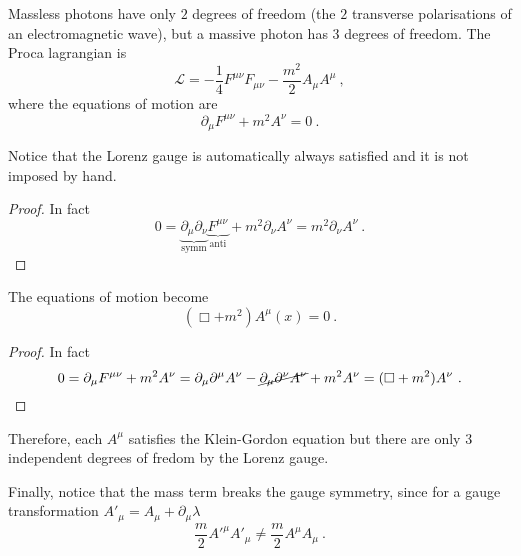     Massless photons have only $2$ degrees of freedom (the $2$ transverse polarisations of an electromagnetic wave), but a massive photon has $3$ degrees of freedom. The Proca lagrangian is 
    \begin{equation*}
        \mathcal L = - \frac{1}{4} F^{\mu\nu} F_{\mu\nu} - \frac{m^2}{2} A_\mu A^\mu ~,
    \end{equation*}
    where the equations of motion are 
    \begin{equation*}
        \partial_\mu F^{\mu\nu} + m^2 A^\nu = 0~.
    \end{equation*}

    Notice that the Lorenz gauge is automatically always satisfied and it is not imposed by hand.
    \begin{proof}
        In fact 
        \begin{equation}
            0 = \underbrace{\partial_\mu \partial_\nu}_{\text{symm}} \underbrace{F^{\mu\nu}}_{\text{anti}} + m^2 \partial_\nu A^\nu = m^2 \partial_\nu A^\nu ~.
        \end{equation}
    \end{proof}

    The equations of motion become
    \begin{equation*}
        (\Box + m^2) A^\mu (x) = 0 ~.
    \end{equation*}
    \begin{proof}
        In fact
        \begin{equation*}
            0 = \partial_\mu F^{\mu\nu} + m^2 A^\nu = \partial_\mu \partial^\mu A^\nu - \cancel{\partial_\mu \partial^\nu A^\nu} + m^2 A^\nu = (\Box + m^2) A^\nu ~.
        \end{equation*}
    \end{proof}
    Therefore, each $A^\mu$ satisfies the Klein-Gordon equation but there are only $3$ independent degrees of fredom by the Lorenz gauge. 

    Finally, notice that the mass term breaks the gauge symmetry, since for a gauge transformation ${A'}_\mu = A_\mu + \partial_\mu \lambda$
    \begin{equation*}
        \frac{m}{2} {A'}^\mu {A'}_\mu \neq \frac{m}{2} A^\mu A_\mu ~.
    \end{equation*}